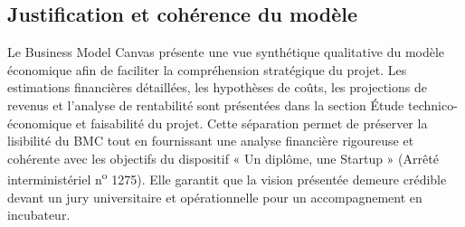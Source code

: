 \documentclass[11pt,a4paper]{article}
\begin{document}
\subsection{Justification et cohérence du modèle}
Le Business Model Canvas présente une vue synthétique qualitative du modèle économique afin de faciliter la compréhension stratégique du projet. Les estimations financières détaillées, les hypothèses de coûts, les projections de revenus et l'analyse de rentabilité sont présentées dans la section Étude technico-économique et faisabilité du projet. Cette séparation permet de préserver la lisibilité du BMC tout en fournissant une analyse financière rigoureuse et cohérente avec les objectifs du dispositif « Un diplôme, une Startup » (Arrêté interministériel n\textsuperscript{o} 1275). Elle garantit que la vision présentée demeure crédible devant un jury universitaire et opérationnelle pour un accompagnement en incubateur.
\end{document}
